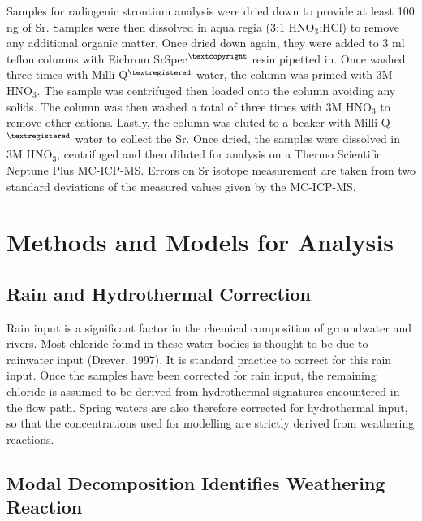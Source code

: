 Samples for radiogenic strontium analysis were dried down to provide at least 100 ng of Sr. Samples were then dissolved in aqua regia (3:1 HNO$_\text{3}$:HCl) to remove any additional organic matter. Once dried down again, they were added to 3 ml teflon columns with Eichrom SrSpec$^{\textcopyright}$ resin pipetted in. Once washed three times with Milli-Q$^{\textregistered}$ water, the column was primed with 3M HNO$_\text{3}$. The sample was centrifuged then loaded onto the column avoiding any solids. The column was then washed a total of three times with 3M HNO$_3$ to remove other cations. Lastly, the column was eluted to a beaker with Milli-Q$^{\textregistered}$ water to collect the Sr. Once dried, the samples were dissolved in 3M HNO$_\text{3}$, centrifuged and then diluted for analysis on a Thermo Scientific Neptune Plus MC-ICP-MS. Errors on Sr isotope measurement are taken from two standard deviations of the measured values given by the MC-ICP-MS.




\section{Methods and Models for Analysis}


\subsection{Rain and Hydrothermal Correction}

Rain input is a significant factor in the chemical composition of groundwater and rivers. Most chloride found in these water bodies is thought to be due to rainwater input (Drever, 1997). It is standard practice to correct for this rain input. Once the samples have been corrected for rain input, the remaining chloride is assumed to be derived from hydrothermal signatures encountered in the flow path. Spring waters are also therefore corrected for hydrothermal input, so that the concentrations used for modelling are strictly derived from weathering reactions.

\subsection{Modal Decomposition Identifies Weathering Reaction}

